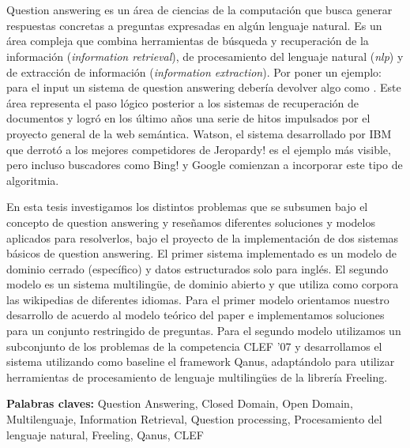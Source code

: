 \chapter*{\runtitulo}
Question answering es un área de ciencias de la computación que busca generar respuestas concretas a preguntas expresadas en algún lenguaje natural. Es un área compleja que combina herramientas de búsqueda y recuperación de la información (\textit{information retrieval}), de procesamiento del lenguaje natural (\textit{nlp}) y de extracción de información (\textit{information extraction}). Por poner un ejemplo: para el input \textit{} un sistema de question answering debería devolver algo como .
Este área representa el paso lógico posterior a los sistemas de recuperación de documentos y logró en los último años una serie de hitos impulsados por el proyecto general de la web semántica. Watson, el sistema desarrollado por IBM que derrotó a los mejores competidores de Jeropardy! es el ejemplo más visible, pero incluso buscadores como Bing! y Google comienzan a incorporar este tipo de algoritmia.

En esta tesis investigamos los distintos problemas que se subsumen bajo el concepto de question answering y reseñamos diferentes soluciones y modelos aplicados para resolverlos, bajo el proyecto de la implementación de dos sistemas básicos de question answering. El primer sistema implementado es un modelo de dominio cerrado (específico) y datos estructurados solo para inglés. El segundo modelo es un sistema multilingüe, de dominio abierto y que utiliza como corpora las wikipedias de diferentes idiomas. Para el primer modelo orientamos nuestro desarrollo de acuerdo al modelo teórico del paper \cite{QADB1} e implementamos soluciones para un conjunto restringido de preguntas.  Para el segundo modelo utilizamos  un subconjunto de los problemas de la competencia CLEF '07 y desarrollamos el sistema utilizando como baseline el framework Qanus, adaptándolo para utilizar herramientas de procesamiento de lenguaje multilingües de la librería Freeling.
\bigskip

\noindent\textbf{Palabras claves:} Question Answering, Closed Domain, Open Domain, Multilenguaje, Information Retrieval, Question processing, Procesamiento del lenguaje natural, Freeling, Qanus, CLEF